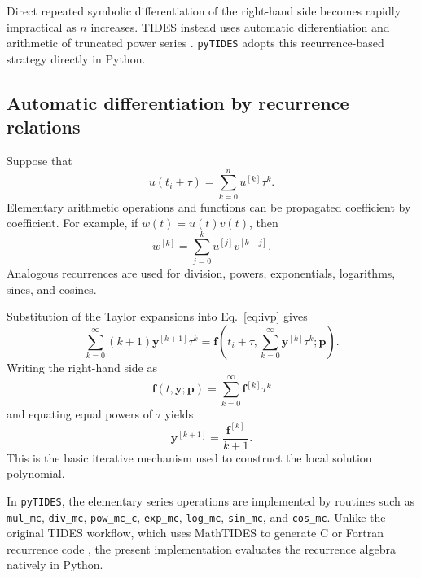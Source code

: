 \documentclass[11pt]{article}
\begin{document}
Direct repeated symbolic differentiation of the right-hand side becomes
rapidly impractical as $n$ increases. TIDES instead uses automatic
differentiation and arithmetic of truncated power series
\citep{Abad2012}. \texttt{pyTIDES} adopts this recurrence-based strategy
directly in Python.

\subsection{Automatic differentiation by recurrence relations}

Suppose that
\begin{equation}
    u(t_i+\tau)=\sum_{k=0}^{n}u^{[k]}\tau^k.
\end{equation}
Elementary arithmetic operations and functions can be propagated coefficient
by coefficient. For example, if $w(t)=u(t)v(t)$, then
\begin{equation}
    w^{[k]}=\sum_{j=0}^{k}u^{[j]}v^{[k-j]}.
    \label{eq:product-recurrence}
\end{equation}
Analogous recurrences are used for division, powers, exponentials,
logarithms, sines, and cosines.

Substitution of the Taylor expansions into Eq.~\eqref{eq:ivp} gives
\begin{equation}
    \sum_{k=0}^{\infty}(k+1)\bm y^{[k+1]}\tau^k
    =
    \bm f\left(
        t_i+\tau,
        \sum_{k=0}^{\infty}\bm y^{[k]}\tau^k;
        \bm p
    \right).
\end{equation}
Writing the right-hand side as
\begin{equation}
    \bm f(t,\bm y;\bm p)
    =
    \sum_{k=0}^{\infty}\bm f^{[k]}\tau^k
\end{equation}
and equating equal powers of $\tau$ yields
\begin{equation}
    \boxed{\bm y^{[k+1]}=\frac{\bm f^{[k]}}{k+1}}.
    \label{eq:ode-recurrence}
\end{equation}
This is the basic iterative mechanism used to construct the local solution
polynomial.

In \texttt{pyTIDES}, the elementary series operations are implemented by
routines such as \texttt{mul\_mc}, \texttt{div\_mc},
\texttt{pow\_mc\_c}, \texttt{exp\_mc}, \texttt{log\_mc},
\texttt{sin\_mc}, and \texttt{cos\_mc}. Unlike the original TIDES workflow,
which uses MathTIDES to generate C or Fortran recurrence code
\citep{Abad2012}, the present implementation evaluates the recurrence
algebra natively in Python.
\end{document}
